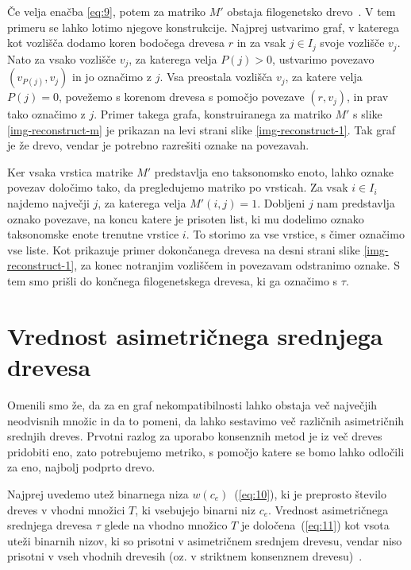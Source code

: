\documentclass[a4paper, 12pt]{book}
\begin{document}
\noindent Če velja enačba \ref{eq:9}, potem za matriko $M'$ obstaja filogenetsko 
drevo~\cite{gd}. V tem primeru se lahko lotimo njegove konstrukcije. Najprej 
ustvarimo graf, v katerega kot vozlišča dodamo koren bodočega drevesa $r$ in za 
vsak $j \in I_j$ svoje vozlišče $v_j$. Nato za vsako vozlišče $v_j$, za katerega 
velja $P(j) > 0$, ustvarimo povezavo $(v_{P(j)}, v_j)$ in jo označimo z $j$. 
Vsa preostala vozlišča $v_j$, za katere velja $P(j) = 0$, povežemo s korenom 
drevesa s pomočjo povezave $(r, v_j)$, in prav tako označimo z $j$. Primer takega
grafa, konstruiranega za matriko $M'$ s slike \ref{img-reconstruct-m} je prikazan
na levi strani slike \ref{img-reconstruct-1}. Tak graf je že drevo, vendar je potrebno 
razrešiti oznake na povezavah.


Ker vsaka vrstica matrike $M'$ predstavlja eno taksonomsko enoto, lahko oznake povezav
določimo tako, da pregledujemo matriko po vrsticah. Za vsak $i \in I_i$ najdemo največji 
$j$, za katerega velja $M'(i, j) = 1$. Dobljeni $j$ nam predstavlja oznako povezave, 
na koncu katere je prisoten list, ki mu dodelimo oznako taksonomske enote trenutne
vrstice $i$. To storimo za vse vrstice, s čimer označimo vse liste. Kot prikazuje 
primer dokončanega drevesa na desni strani slike \ref{img-reconstruct-1}, za konec 
notranjim vozliščem in povezavam odstranimo oznake. S tem smo prišli do končnega 
filogenetskega drevesa, ki ga označimo s $\tau$.  

\section{Vrednost asimetričnega srednjega drevesa}
Omenili smo že, da za en graf nekompatibilnosti lahko obstaja več največjih 
neodvisnih množic in da to pomeni, da lahko sestavimo več različnih 
asimetričnih srednjih dreves. Prvotni razlog za uporabo konsenznih metod 
je iz več dreves pridobiti eno, zato potrebujemo metriko, s pomočjo 
katere se bomo lahko odločili za eno, najbolj podprto drevo.  

Najprej uvedemo utež binarnega niza $w(c_e)$~(\ref{eq:10}), ki je preprosto 
število dreves v vhodni množici $T$, ki vsebujejo binarni niz $c_e$. Vrednost 
asimetričnega srednjega drevesa $\tau$ glede na vhodno množico $T$ je 
določena~(\ref{eq:11}) kot vsota uteži binarnih nizov, ki so prisotni v 
asimetričnem srednjem drevesu, vendar niso prisotni v vseh vhodnih drevesih 
(oz. v striktnem konsenznem drevesu)~\cite{pw}.
\end{document}
